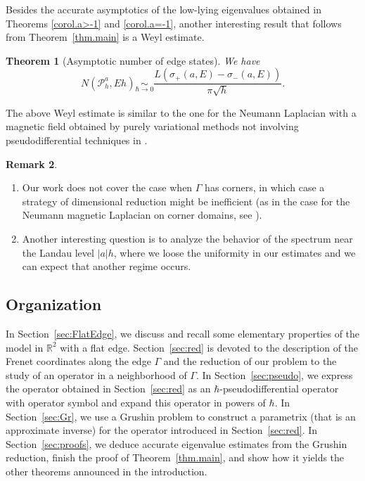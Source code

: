 \documentclass[JEP,XML,SOM,Unicode,NoFloatCountersInSection,published]{cedram}
\newcommand{\cP}{\mathcal{P}}
\theoremstyle{plain}
\newtheorem{theorem}{Theorem}[section]
\theoremstyle{definition}
\newtheorem{remark}[theorem]{Remark}
\newcommand{\R}{\mathbb{R}}
\begin{document}
Besides the accurate asymptotics of the low-lying eigenvalues obtained in Theorems \ref{corol.a>-1} and \ref{corol.a=-1}, another interesting result that follows from Theorem~\ref{thm.main} is a Weyl estimate.

\begin{theorem}[Asymptotic number of edge states]\label{corol.weyl}
We have
\[
N(\cP^a_h, Eh)\underset{\hbar\to 0}\sim \frac{L(\sigma_+(a,E)-\sigma_-(a,E))}{\pi\sqrt{h}}.
\]
\end{theorem}

The above Weyl estimate is similar to the one for the Neumann Laplacian with a magnetic field obtained by purely variational methods
not involving pseudodifferential techniques in \cite{F07, FK, KK}.

\enlargethispage{-\baselineskip}
\pagebreak[2]
\skpt
\begin{remark}
\begin{enumerate}
\item Our work does not cover the case when $\Gamma$ has corners, in which case a strategy of dimensional reduction might be inefficient (as in the case for the Neumann magnetic Laplacian on corner domains, see \cite{BN, BND06}).
\item Another interesting question is to analyze the behavior of the spectrum near the Landau level $|a|h$, where we loose the uniformity in our estimates and we can expect that another regime occurs.
\end{enumerate}
\end{remark}

\subsection{Organization}

In Section~\ref{sec:FlatEdge}, we discuss and recall some elementary properties of the model in $\R^2$ with a flat edge.
Section~\ref{sec:red} is devoted to the description of the Frenet coordinates along the edge $\Gamma$ and the reduction of our problem to the study of an operator in a neighborhood of $\Gamma$.
In Section~\ref{sec:pseudo}, we express the operator obtained in Section~\ref{sec:red} as an $\hbar$-pseudodifferential operator with operator symbol and expand this operator in powers of $\hbar$. In Section~\ref{sec:Gr}, we use a Grushin problem to construct a parametrix (that is an approximate inverse) for the operator introduced in Section~\ref{sec:red}.
In Section~\ref{sec:proofs}, we deduce accurate eigenvalue estimates from the Grushin reduction, finish the proof of Theorem~\ref{thm.main}, and show how it yields the other theorems announced in the introduction.
\end{document}

